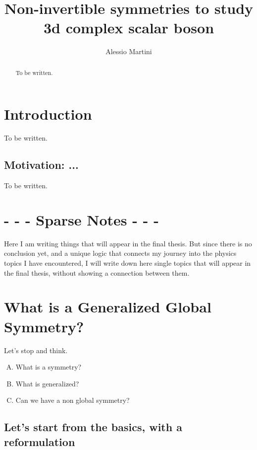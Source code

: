 \documentclass[aps,preprint,nofootinbib,preprintnumbers,eqsecnum,superscriptaddress]{revtex4}
\newcommand{\ben}{\begin{enumerate}}
\newcommand{\een}{\end{enumerate}}
\numberwithin{equation}{section}
\begin{document}
\title{Non-invertible symmetries to study 3d complex scalar boson}
\author{Alessio Martini} 
\begin{abstract}
To be written.
\end{abstract} 
\maketitle


\tableofcontents

\newpage

\section{Introduction}

To be written. 

\subsection{Motivation: ...} \label{sec:motivation} 

To be written.

\newpage

\section*{- - - Sparse Notes - - -}

Here I am writing things that will appear in the final thesis. But since there is no conclusion yet, and a unique logic that connects my journey into the physics topics I have encountered, I will write down here single topics that will appear in the final thesis, without showing a connection between them.

\section{What is a Generalized Global Symmetry?} \label{sec:gensym_intro} 

Let's stop and think. 
\ben[A.]
    \item What is a symmetry?
    \item What is generalized?
    \item Can we have a non global symmetry?
\een

\subsection{Let's start from the basics, with a reformulation}
\label{sec:reformulation_symemtry}
\end{document}
